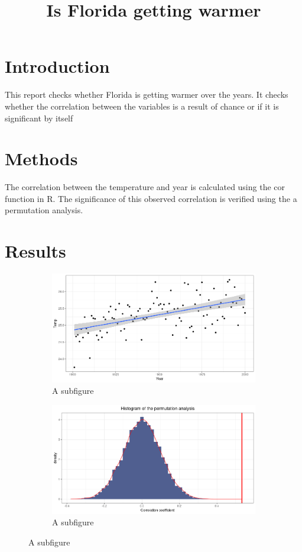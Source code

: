 \documentclass[12pt]{article}
\title{Is Florida getting warmer}
\begin{document}
    \maketitle

    \section{Introduction}
        This report checks whether Florida is getting warmer over the years. It checks whether the correlation between the variables is a result of chance or if it is significant by itself

    \section{Methods}
        The correlation between the temperature and year is calculated using the cor function in R. 
        The significance of this observed correlation is verified using the a permutation analysis. 

    \section{Results}    
    \begin{figure}
        \centering
        \begin{subfigure}{.5\textwidth}
          \centering
          \includegraphics[width=.75\linewidth]{../../week3/data/latex1.png}
          \caption{A subfigure}
          \label{fig:sub1}
        \end{subfigure}%
        \begin{subfigure}{.5\textwidth}
          \centering
          \includegraphics[width=.75\linewidth]{../../week3/data/latex2.png}
          \caption{A subfigure}
          \label{fig:sub2}
        \end{subfigure}
        \label{fig_req}
    \end{figure}
\end{document}
